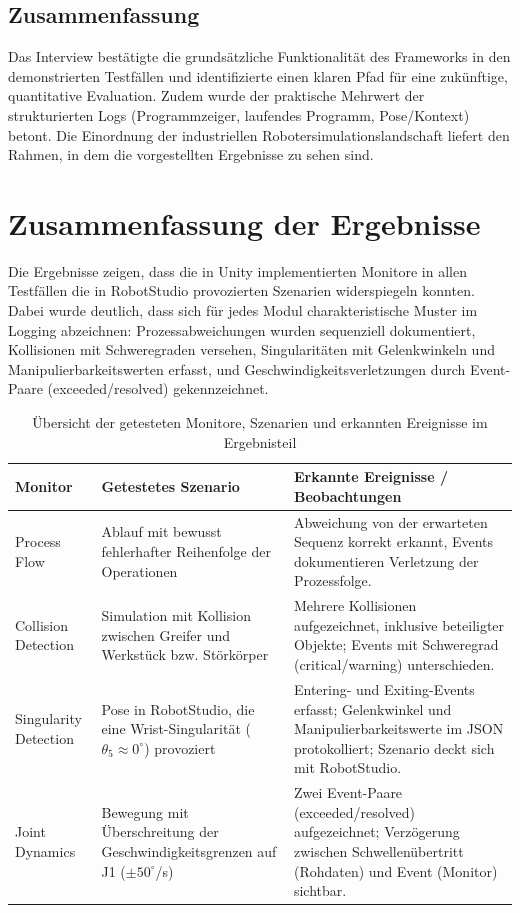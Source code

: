 \subsection{Zusammenfassung}

Das Interview bestätigte die grundsätzliche
Funktionalität des Frameworks in den demonstrierten Testfällen und
identifizierte einen klaren Pfad für eine zukünftige, quantitative Evaluation.
Zudem wurde der praktische Mehrwert der strukturierten Logs (Programmzeiger,
laufendes Programm, Pose/Kontext) betont. Die Einordnung der industriellen
Robotersimulationslandschaft liefert den Rahmen, in dem die
vorgestellten Ergebnisse zu
sehen sind.
\newpage
\section{Zusammenfassung der Ergebnisse}
Die Ergebnisse zeigen, dass die in Unity implementierten Monitore in allen
Testfällen die in RobotStudio provozierten Szenarien widerspiegeln konnten.
Dabei wurde deutlich, dass sich für jedes Modul charakteristische Muster im
Logging abzeichnen: Prozessabweichungen wurden sequenziell dokumentiert,
Kollisionen mit Schweregraden versehen, Singularitäten mit Gelenkwinkeln und
Manipulierbarkeitswerten erfasst, und Geschwindigkeitsverletzungen durch
Event-Paare (exceeded/resolved) gekennzeichnet.

\begin{table}[H]
  \centering
  \small
  \begin{tabularx}{\textwidth}{lXX}
    \toprule
    \textbf{Monitor}      & \textbf{Getestetes Szenario}
    & \textbf{Erkannte Ereignisse / Beobachtungen}
    \\
    \midrule
    Process Flow          & Ablauf mit bewusst fehlerhafter
    Reihenfolge der Operationen                                &
    Abweichung von der erwarteten Sequenz korrekt erkannt, Events
    dokumentieren Verletzung der Prozessfolge.
    \\
    \addlinespace
    Collision Detection   & Simulation mit Kollision zwischen Greifer
    und Werkstück bzw. Störkörper                    & Mehrere
    Kollisionen aufgezeichnet, inklusive beteiligter Objekte; Events
    mit Schweregrad (critical/warning) unterschieden.                 \\
    \addlinespace
    Singularity Detection & Pose in RobotStudio, die eine
    Wrist-Singularität ($\theta_{5} \approx 0^\circ$) provoziert &
    Entering- und Exiting-Events erfasst; Gelenkwinkel und
    Manipulierbarkeitswerte im JSON protokolliert; Szenario deckt
    sich mit RobotStudio. \\
    \addlinespace
    Joint Dynamics        & Bewegung mit Überschreitung der
    Geschwindigkeitsgrenzen auf J1 ($\pm 50^\circ$/s)          & Zwei
    Event-Paare (exceeded/resolved) aufgezeichnet; Verzögerung
    zwischen Schwellenübertritt (Rohdaten) und Event (Monitor)
    sichtbar.       \\
    \bottomrule
  \end{tabularx}
  \caption{Übersicht der getesteten Monitore, Szenarien und erkannten
  Ereignisse im Ergebnisteil}
  \label{tab:monitor_overview}
\end{table}

